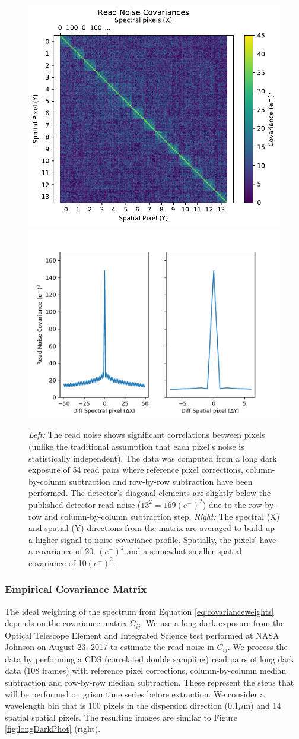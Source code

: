 \documentclass[]{aastex62}
\begin{document}
\begin{figure}[!hbtp]
\centering
\includegraphics[width=.49\columnwidth]{spec_spatial_cov.pdf}
\includegraphics[width=.49\columnwidth]{cross_sections_cov.pdf}
\caption{{\it Left:} The read noise shows significant correlations between pixels (unlike the traditional assumption that each pixel's noise is statistically independent).
The data was computed from a long dark exposure of 54 read pairs where reference pixel corrections, column-by-column subtraction and row-by-row subtraction have been performed.
The detector's diagonal elements are slightly below the published detector read noise ($13^2 = 169 (e^-)^2$) due to the row-by-row and column-by-column subtraction step.
{\it Right:} The spectral (X) and spatial (Y) directions from the matrix are averaged to build up a higher signal to noise covariance profile.
Spatially, the pixels' have a covariance of 20~$(e^-)^2$ and a somewhat smaller spatial covariance of 10$(e^-)^2$.}\label{fig:covSpecSpatial}
\end{figure}

\subsubsection{Empirical Covariance Matrix}\label{sec:empCovarianceMatrix}
The ideal weighting of the spectrum from Equation \ref{eq:covarianceweights} depends on the covariance matrix $C_{ij}$.
We use a long dark exposure from the Optical Telescope Element and Integrated Science test performed at NASA Johnson on August 23, 2017 to estimate the read noise in $C_{ij}$.
We process the data by performing a CDS (correlated double sampling) read pairs of long dark data (108 frames) with reference pixel corrections, column-by-column median subtraction and row-by-row median subtraction.
These represent the steps that will be performed on grism time series before extraction.
We consider a wavelength bin that is 100 pixels in the dispersion direction (0.1$\mu$m) and 14 spatial spatial pixels.
The resulting images are similar to Figure \ref{fig:longDarkPhot} (right).
\end{document}
